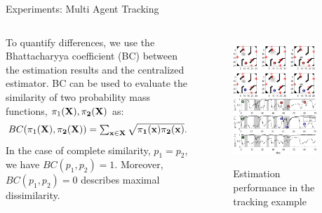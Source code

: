 \documentclass{beamer}
\newcommand{\vect}{\bf}
\theoremstyle{remark}
\begin{document}
\begin{frame}{Experiments: Multi Agent Tracking}
\begin{columns}
{\begin{exampleblock}
			To quantify differences, we use the 
			{\color{red}Bhattacharyya coefficient (BC)} {\color{olive}\cite{bhattacharyya1946measure}} between the estimation results and 
			the 
			centralized estimator. BC can be used to evaluate 
			the 
			{\color{orange}similarity of two probability mass functions}, $\pi_1(\vect{X}), 
			\pi_2(\vect{X})$ as:
			{\color{blue}
				\begin{equation*}
				\textstyle BC(\pi_1(\vect{X}),\pi_2(\vect{X})) = \sum_{\vect{x}\in 
					\vect{X}}\sqrt{\pi_1(\vect{x}) \pi_2(\vect{x})}.
				\end{equation*}}
			In the case of complete similarity, $p_1= p_2$, we have $BC(p_1,p_2)=1$. Moreover, 
			$BC(p_1,p_2)=0$ describes maximal dissimilarity.
		\end{exampleblock}}
		\begin{figure}
			\centering
			{\includegraphics[width=0.85\textwidth, trim={0cm 0cm 0cm 0cm},clip]{./figs/exp2.pdf}}
			\caption*{\tiny Estimation performance in the tracking example}
		\end{figure}
	\end{columns}
\end{frame}
\end{document}
